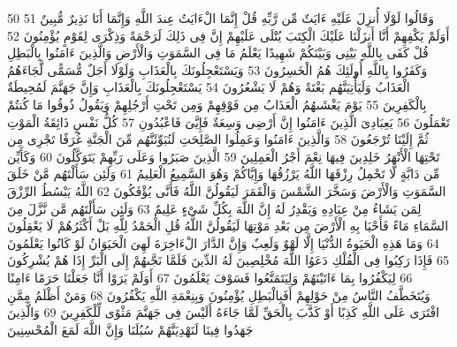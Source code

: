 \documentclass[20pt,a4paper]{article}
\begin{document}
{\tiny\colorbox{cl_aya}{50}} وَقَالُوا لَوْلَا أُنزِلَ عَلَيْهِ ءَايَتٌ مِّن رَّبِّهِ قُلْ إِنَّمَا الْءَايَتُ عِندَ اللَّهِ وَإِنَّمَا أَنَا نَذِيرٌ مُّبِينٌ
{\tiny\colorbox{cl_aya}{51}} أَوَلَمْ يَكْفِهِمْ أَنَّا أَنزَلْنَا عَلَيْكَ الْكِتَبَ يُتْلَى عَلَيْهِمْ إِنَّ فِى ذَلِكَ لَرَحْمَةً وَذِكْرَى لِقَوْمٍ يُؤْمِنُونَ
{\tiny\colorbox{cl_aya}{52}} قُلْ كَفَى بِاللَّهِ بَيْنِى وَبَيْنَكُمْ شَهِيدًا يَعْلَمُ مَا فِى السَّمَوَتِ وَالْأَرْضِ وَالَّذِينَ ءَامَنُوا بِالْبَطِلِ وَكَفَرُوا بِاللَّهِ أُولَئِكَ هُمُ الْخَسِرُونَ
{\tiny\colorbox{cl_aya}{53}} وَيَسْتَعْجِلُونَكَ بِالْعَذَابِ وَلَوْلَا أَجَلٌ مُّسَمًّى لَّجَاءَهُمُ الْعَذَابُ وَلَيَأْتِيَنَّهُم بَغْتَةً وَهُمْ لَا يَشْعُرُونَ
{\tiny\colorbox{cl_aya}{54}} يَسْتَعْجِلُونَكَ بِالْعَذَابِ وَإِنَّ جَهَنَّمَ لَمُحِيطَةٌ بِالْكَفِرِينَ
{\tiny\colorbox{cl_aya}{55}} يَوْمَ يَغْشَىهُمُ الْعَذَابُ مِن فَوْقِهِمْ وَمِن تَحْتِ أَرْجُلِهِمْ وَيَقُولُ ذُوقُوا مَا كُنتُمْ تَعْمَلُونَ
{\tiny\colorbox{cl_aya}{56}} يَعِبَادِىَ الَّذِينَ ءَامَنُوا إِنَّ أَرْضِى وَسِعَةٌ فَإِيَّىَ فَاعْبُدُونِ
{\tiny\colorbox{cl_aya}{57}} كُلُّ نَفْسٍ ذَائِقَةُ الْمَوْتِ ثُمَّ إِلَيْنَا تُرْجَعُونَ
{\tiny\colorbox{cl_aya}{58}} وَالَّذِينَ ءَامَنُوا وَعَمِلُوا الصَّلِحَتِ لَنُبَوِّئَنَّهُم مِّنَ الْجَنَّةِ غُرَفًا تَجْرِى مِن تَحْتِهَا الْأَنْهَرُ خَلِدِينَ فِيهَا نِعْمَ أَجْرُ الْعَمِلِينَ
{\tiny\colorbox{cl_aya}{59}} الَّذِينَ صَبَرُوا وَعَلَى رَبِّهِمْ يَتَوَكَّلُونَ
{\tiny\colorbox{cl_aya}{60}} وَكَأَيِّن مِّن دَابَّةٍ لَّا تَحْمِلُ رِزْقَهَا اللَّهُ يَرْزُقُهَا وَإِيَّاكُمْ وَهُوَ السَّمِيعُ الْعَلِيمُ
{\tiny\colorbox{cl_aya}{61}} وَلَئِن سَأَلْتَهُم مَّنْ خَلَقَ السَّمَوَتِ وَالْأَرْضَ وَسَخَّرَ الشَّمْسَ وَالْقَمَرَ لَيَقُولُنَّ اللَّهُ فَأَنَّى يُؤْفَكُونَ
{\tiny\colorbox{cl_aya}{62}} اللَّهُ يَبْسُطُ الرِّزْقَ لِمَن يَشَاءُ مِنْ عِبَادِهِ وَيَقْدِرُ لَهُ إِنَّ اللَّهَ بِكُلِّ شَىْءٍ عَلِيمٌ
{\tiny\colorbox{cl_aya}{63}} وَلَئِن سَأَلْتَهُم مَّن نَّزَّلَ مِنَ السَّمَاءِ مَاءً فَأَحْيَا بِهِ الْأَرْضَ مِن بَعْدِ مَوْتِهَا لَيَقُولُنَّ اللَّهُ قُلِ الْحَمْدُ لِلَّهِ بَلْ أَكْثَرُهُمْ لَا يَعْقِلُونَ
{\tiny\colorbox{cl_aya}{64}} وَمَا هَذِهِ الْحَيَوةُ الدُّنْيَا إِلَّا لَهْوٌ وَلَعِبٌ وَإِنَّ الدَّارَ الْءَاخِرَةَ لَهِىَ الْحَيَوَانُ لَوْ كَانُوا يَعْلَمُونَ
{\tiny\colorbox{cl_aya}{65}} فَإِذَا رَكِبُوا فِى الْفُلْكِ دَعَوُا اللَّهَ مُخْلِصِينَ لَهُ الدِّينَ فَلَمَّا نَجَّىهُمْ إِلَى الْبَرِّ إِذَا هُمْ يُشْرِكُونَ
{\tiny\colorbox{cl_aya}{66}} لِيَكْفُرُوا بِمَا ءَاتَيْنَهُمْ وَلِيَتَمَتَّعُوا فَسَوْفَ يَعْلَمُونَ
{\tiny\colorbox{cl_aya}{67}} أَوَلَمْ يَرَوْا أَنَّا جَعَلْنَا حَرَمًا ءَامِنًا وَيُتَخَطَّفُ النَّاسُ مِنْ حَوْلِهِمْ أَفَبِالْبَطِلِ يُؤْمِنُونَ وَبِنِعْمَةِ اللَّهِ يَكْفُرُونَ
{\tiny\colorbox{cl_aya}{68}} وَمَنْ أَظْلَمُ مِمَّنِ افْتَرَى عَلَى اللَّهِ كَذِبًا أَوْ كَذَّبَ بِالْحَقِّ لَمَّا جَاءَهُ أَلَيْسَ فِى جَهَنَّمَ مَثْوًى لِّلْكَفِرِينَ
{\tiny\colorbox{cl_aya}{69}} وَالَّذِينَ جَهَدُوا فِينَا لَنَهْدِيَنَّهُمْ سُبُلَنَا وَإِنَّ اللَّهَ لَمَعَ الْمُحْسِنِينَ
\end{document}
